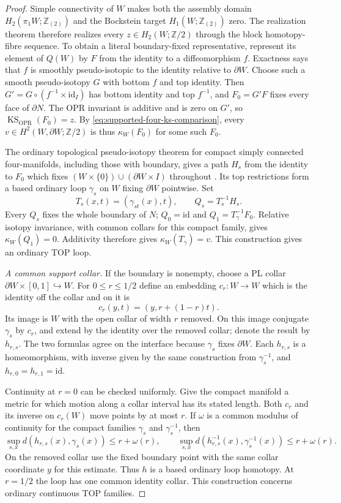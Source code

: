 \begin{proof}
Simple connectivity of $W$ makes both the assembly domain
$H_2(\pi_1W;\mathbb Z_{(2)})$ and the Bockstein target
$H_1(W;\mathbb Z_{(2)})$ zero. The realization theorem
\cite[Theorem~2.3(D), p.~6; Definition~5.8 and proof,
pp.~21--22]{OrsonPowellRandalWilliams2026}
therefore realizes every $z\in H_2(W;\mathbb Z/2)$ through
the block homotopy-fibre sequence. To obtain a literal
boundary-fixed representative, represent its element of $Q(W)$
by $F$ from the identity to a diffeomorphism $f$.
Exactness says that $f$ is smoothly pseudo-isotopic to the
identity relative to $\partial W$. Choose such a smooth
pseudo-isotopy $G$ with bottom $f$ and top identity.
Then $G'=G\circ(f^{-1}\times\mathrm{id}_I)$ has bottom
identity and top $f^{-1}$, and $F_0=G'F$ fixes every face
of $\partial N$. The OPR invariant is additive and is zero
on $G'$, so $\operatorname{KS}_{\mathrm{OPR}}(F_0)=z$.
By \eqref{eq:supported-four-ks-comparison}, every
$v\in H^2(W,\partial W;\mathbb Z/2)$ is thus
$\kappa_W(F_0)$ for some such $F_0$.

The ordinary topological pseudo-isotopy theorem for compact
simply connected four-manifolds, including those with boundary,
gives a path $H_s$ from the identity to $F_0$ which fixes
$(W\times\{0\})\cup(\partial W\times I)$ throughout
\cite[Theorem~1.5, p.~3; relative convention, p.~1]
{GabaiGayHartmanKrushkalPowell2026}.
Its top restrictions form a based ordinary loop $\gamma_s$
on $W$ fixing $\partial W$ pointwise. Set
\[
 T_s(x,t)=(\gamma_{st}(x),t),\qquad Q_s=T_s^{-1}H_s.
\]
Every $Q_s$ fixes the whole boundary of $N$;
$Q_0=\mathrm{id}$ and $Q_1=T_\gamma^{-1}F_0$.
Relative isotopy invariance, with common collars for this
compact family, gives $\kappa_W(Q_1)=0$. Additivity therefore
gives $\kappa_W(T_\gamma)=v$. This construction gives an ordinary TOP loop.

\emph{A common support collar.}
If the boundary is nonempty, choose a PL collar
$\partial W\times[0,1]\hookrightarrow W$.
For $0\le r\le1/2$ define an embedding $c_r:W\to W$
which is the identity off the collar and on it is
\[
 c_r(y,t)=(y,r+(1-r)t).
\]
Its image is $W$ with the open collar of width $r$ removed.
On this image conjugate $\gamma_s$ by $c_r$, and extend
by the identity over the removed collar; denote the result
by $h_{r,s}$. The two formulas agree on the interface because
$\gamma_s$ fixes $\partial W$. Each $h_{r,s}$ is a
homeomorphism, with inverse given by the same construction
from $\gamma_s^{-1}$, and
$h_{r,0}=h_{r,1}=\mathrm{id}$.

Continuity at $r=0$ can be checked uniformly. Give the compact
manifold a metric for which motion along a collar interval has
its stated length. Both $c_r$ and its inverse on $c_r(W)$
move points by at most $r$. If $\omega$ is a common modulus
of continuity for the compact families $\gamma_s$ and
$\gamma_s^{-1}$, then
\[
 \sup_{s,x}d(h_{r,s}(x),\gamma_s(x))\le r+\omega(r),
 \qquad
 \sup_{s,x}d(h_{r,s}^{-1}(x),\gamma_s^{-1}(x))
                                      \le r+\omega(r).
\]
On the removed collar use the fixed boundary point with the
same collar coordinate $y$ for this estimate. Thus $h$ is
a based ordinary loop homotopy. At $r=1/2$ the loop has
one common identity collar. This construction concerns
ordinary continuous TOP families.


\end{proof}
